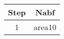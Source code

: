 \documentclass{article}
\begin{document}
\begin{tabular}{|c|c|}
\hline
Step&Nabf\\
\hline
1&area10\\\hline
\end{tabular}
\end{document}
